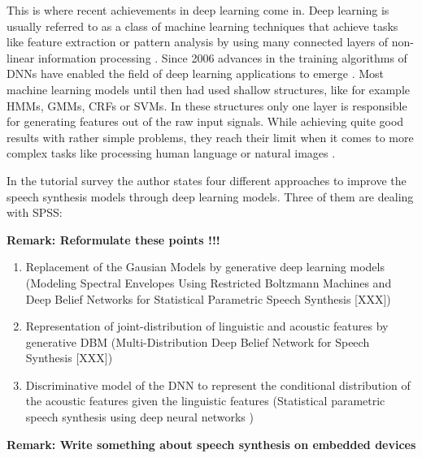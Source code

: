 This is where recent achievements in deep learning come in. Deep learning is usually referred to as a class of machine learning techniques that achieve tasks like feature extraction or pattern analysis by using many connected layers of non-linear information processing \cite{ling:deep, li:survey}. Since 2006 advances in the training algorithms of \acp{DNN} have enabled the field of deep learning applications to emerge \cite{boros:robust}. Most machine learning models until then had used shallow structures, like for example \acp{HMM}, \acp{GMM}, \acp{CRF} or \acp{SVM}. In these structures only one layer is responsible for generating features out of the raw input signals. While achieving quite good results with rather simple problems, they reach their limit when it comes to more complex tasks like processing human language or natural images \cite{li:survey}.

In the tutorial survey \cite{li:survey} the author states four different approaches to improve the speech synthesis models through deep learning models. Three of them are dealing with \ac{SPSS}:

\textcolor{ACMRed}{\bfseries Remark: Reformulate these points !!!}

\begin{enumerate}[leftmargin=16pt]
	\parskip0.5em
	\item Replacement of the Gausian Models by generative deep learning models (Modeling Spectral Envelopes Using Restricted Boltzmann Machines and Deep Belief Networks for Statistical Parametric Speech Synthesis [XXX])
	\item Representation of joint-distribution of linguistic and acoustic features by generative DBM (Multi-Distribution Deep Belief Network for Speech Synthesis [XXX])
	\item Discriminative model of the DNN to represent the conditional distribution of the acoustic features given the linguistic features (Statistical parametric speech synthesis using deep neural networks \cite{zen:deepstatistical})
\end{enumerate}

\textcolor{ACMRed}{\bfseries Remark: Write something about speech synthesis on embedded devices}

\vspace{1em}

